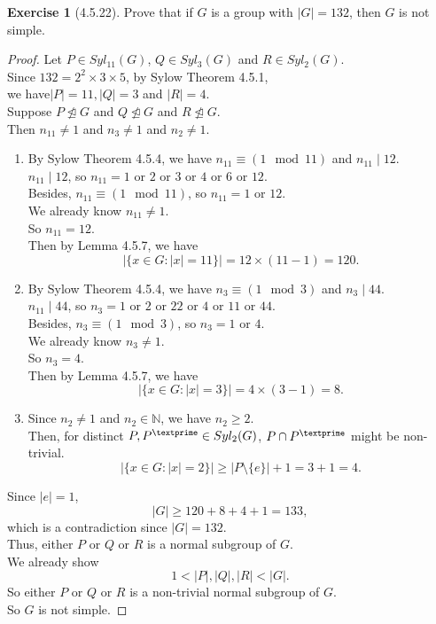 \documentclass{amsart}
\newcommand{\bbn}{\mathbb{N}}
\theoremstyle{plain}
\theoremstyle{definition}
\newtheorem{exer}[lem]{Exercise}
\begin{document}
\begin{exer}[4.5.22]
Prove that if $G$ is a group with $|G|=132$, then $G$ is not simple.
\begin{proof}
 Let $P \in Syl_{11}(G)$, $Q \in Syl_{3}(G)$ and $R \in Syl_{2}(G)$.\\
 Since $132 = 2^2\times 3 \times 5$, by Sylow Theorem 4.5.1, \\
 we have$|P| = 11, |Q| = 3$ and $|R| = 4$.\\
Suppose $P \ntrianglelefteq G$ and $Q \ntrianglelefteq G$ and $R \ntrianglelefteq G$.\\
Then $n_{11} \neq 1$ and $n_{3} \neq 1$ and $n_{2} \neq 1$.
\begin{enumerate}
	\item
	  By Sylow Theorem 4.5.4, we have $n_{11} \equiv (1 \mod{11})$ and $n_{11}\mid 12$.\\
	    $n_{11}\mid 12$, so $n_{11} = 1$ or $2$ or $3$ or $4$ or $6$ or $12$.\\
		Besides, $n_{11} \equiv (1 \mod{11})$, so $n_{11} = 1$ or $12$.\\	
		We already know $n_{11} \neq 1$.\\
		So $n_{11} = 12$.\\
		Then by Lemma 4.5.7, we have
		\[\left|\{x\in G: |x| = 11\}\right| = 12\times (11-1) = 120. \]
	\item
	  By Sylow Theorem 4.5.4, we have $n_{3} \equiv (1 \mod{3})$ and $n_{3}\mid 44$.\\
		$n_{11}\mid 44$, so $n_{3} = 1$ or $2$ or $22$ or $4$ or $11$ or $44$.\\
		Besides, $n_{3} \equiv (1 \mod{3})$, so $n_{3} = 1$ or $4$.\\	
		We already know $n_{3} \neq 1$.\\
		So $n_{3} = 4$.\\
		Then by Lemma 4.5.7, we have
		\[\left|\{x\in G: |x| = 3\}\right| = 4\times (3-1) = 8.\]
	\item
	  	Since $n_2 \neq 1$ and $n_2 \in \bbn$, we have $n_2 \geq 2$.\\
		Then, for distinct $P,P^{\textprime} \in Syl_2(G)$, $P \cap P^{\textprime}$ might be non-trivial.\\
		\[\left|\{x\in G: |x| = 2\}\right| \geq |P\setminus\{e\}| + 1= 3 +1 =4.\]
\end{enumerate}
		Since $|e| = 1$,
		\[|G| \geq 120+8+4+1 = 133,\]
		which is a contradiction since $|G| = 132$. \\
		Thus, either $P$ or $Q$ or $R$ is a normal subgroup of $G$.\\
      	We already show 
      	\[1<|P|,|Q|,|R|<|G|.\]
        So either $P$ or $Q$ or $R$ is a non-trivial normal subgroup of $G$.\\
		So $G$ is not simple.
 
\end{proof}
\end{exer}
\end{document}

